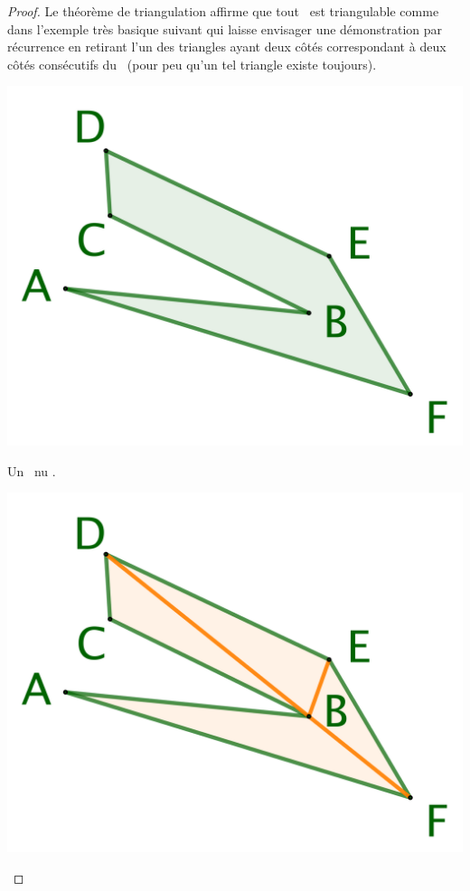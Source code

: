 \begin{proof}
	Le théorème de triangulation affirme que tout \ngone\ est triangulable comme dans l'exemple très basique suivant qui laisse envisager une démonstration par récurrence en retirant l'un des triangles ayant deux côtés correspondant à deux côtés consécutifs du \ngone\ (pour peu qu'un tel triangle existe toujours).


    \begin{multicols}{3}
        \small\itshape
        \begin{center}
            \includegraphics[scale=.4]{content/polygon/at-least-one/triangulation-1.png}

            \smallskip
            Un \ngone\ \og nu \fg.
        \end{center}


        \begin{center}
            \includegraphics[scale=.4]{content/polygon/at-least-one/triangulation-2.png}


\end{center}
\end{multicols}
\end{proof}
